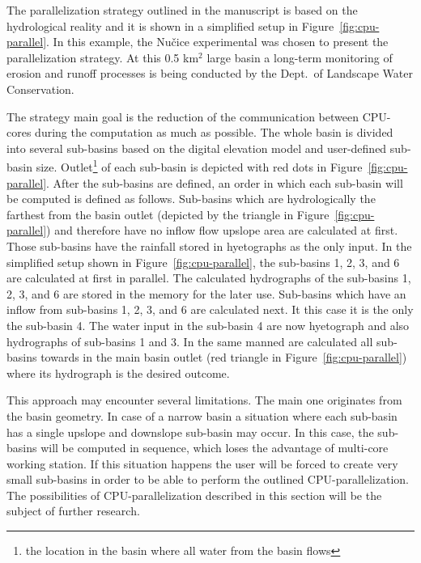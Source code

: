 The parallelization strategy outlined in the manuscript is based on
the hydrological reality and it is shown in a simplified setup in Figure~\ref{fig:cpu-parallel}. In this example, the Nu\v{c}ice experimental 
was chosen to present the parallelization strategy. At this 0.5 km$^2$ large 
basin a long-term monitoring of erosion and runoff processes is being conducted 
by the Dept.\ of Landscape Water Conservation. 

The strategy main goal is the reduction of
the communication between CPU-cores during the computation as much as
possible. The whole basin is divided into several sub-basins based on
the digital elevation model and user-defined sub-basin size. 
Outlet\footnote{the location in the basin where all water from the basin flows} 
of each sub-basin is depicted with
red dots in Figure~\ref{fig:cpu-parallel}. After the sub-basins
are defined, an order in which each sub-basin will be computed is defined as
follows. Sub-basins which are hydrologically the farthest from the
basin outlet (depicted by the triangle in Figure~\ref{fig:cpu-parallel}) 
and therefore have no inflow flow upslope area are
calculated at first. Those sub-basins have the rainfall stored in
hyetographs as the only input. In the simplified setup shown in
Figure~\ref{fig:cpu-parallel}, the sub-basins 1, 2, 3, and 6 are
calculated at first in parallel. The calculated hydrographs of the
sub-basins 1, 2, 3, and 6 are stored in the memory for the later use. 
Sub-basins which
have an inflow from sub-basins 1, 2, 3, and 6 are calculated next. It
this case it is the only the sub-basin 4. The water input in
the sub-basin 4 are now hyetograph and also hydrographs of
sub-basins 1 and 3. In the same manned are
calculated all sub-basins towards in the main basin outlet (red triangle in Figure~\ref{fig:cpu-parallel}) 
where its hydrograph is the desired outcome.

This approach may encounter several limitations. The main one 
originates from the basin geometry. In case of a narrow  basin a situation 
where each sub-basin has a single upslope and downslope sub-basin may occur.
In this case, the sub-basins will be computed in sequence, which
loses the advantage of multi-core working station. If this situation happens
the user will be forced to create very small sub-basins in order to be able 
to perform the outlined CPU-parallelization. The possibilities of CPU-parallelization
described in this section will be the subject of further research.


